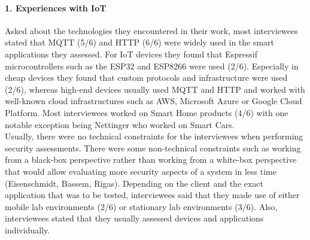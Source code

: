 \paragraph{1. Experiences with \ac{IoT}} Asked about the technologies they encountered in their work, most interviewees stated that \ac{MQTT} (5/6) and \ac{HTTP} (6/6) were widely used in the smart applications they assessed. For \ac{IoT} devices they found that Espressif microcontrollers such as the ESP32 and ESP8266 were used (2/6). Especially in cheap devices they found that custom protocols and infrastructure were used (2/6), whereas high-end devices usually used \ac{MQTT} and \ac{HTTP} and worked with well-known cloud infrastructures such as \ac{AWS}, Microsoft Azure or Google Cloud Platform. Most interviewees worked on Smart Home products (4/6) with one notable exception being Nettinger who worked on Smart Cars.\\
Usually, there were no technical constraints for the interviewees when performing security assessments. There were some non-technical constraints such as working from a black-box perspective rather than working from a white-box perspective that would allow evaluating more security aspects of a system in less time (Eisenschmidt, Bassem, Rigas). Depending on the client and the exact application that was to be tested, interviewees said that they made use of either mobile lab environments (2/6) or stationary lab environments (3/6). Also, interviewees stated that they usually assessed devices and applications individually.%

